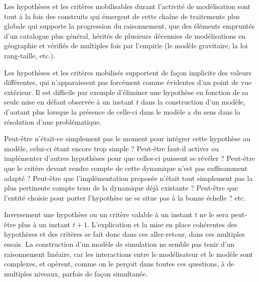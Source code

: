 Les hypothèses et les critères mobilisables durant l'activité de modélisation sont tout à la fois des construits qui émergent de cette chaîne de traitements plus globale qui supporte la progression du raisonnement, que des éléments empruntés d'un catalogue plus général, hérités de plusieurs décennies de modélisations en géographie et vérifiés de multiples fois par l'empirie (le modèle gravitaire, la loi rang-taille, etc.).

Les hypothèses et les critères mobilisés supportent de façon implicite des valeurs différentes, qui n'apparaissent pas forcément comme évidentes d'un point de vue extérieur. Il est difficile par exemple d'éliminer une hypothèse en fonction de sa seule mise en défaut observée à un instant $t$ dans la construction d'un modèle, d'autant plus lorsque la présence de celle-ci dans le modèle a du sens dans la résolution d'une problématique.

Peut-être n'était-ce simplement pas le moment pour intégrer cette hypothèse au modèle, celui-ci étant encore trop simple ? Peut-être faut-il activer ou implémenter d'autres hypothèses pour que celles-ci puissent se révéler ? Peut-être que le critère devant rendre compte de cette dynamique n'est pas suffisamment adapté ? Peut-être que l'implémentation proposée n'était tout simplement pas la plus pertinente compte tenu de la dynamique déjà existante ? Peut-être que l'entité choisie pour porter l'hypothèse ne se situe pas à la bonne échelle ? etc.

Inversement une hypothèse ou un critère valable à un instant $t$ ne le sera peut-être plus à un instant $t + 1$. L'explication et la mise en place cohérentes des hypothèses et des critères se fait donc dans ces aller-retour, dans ces multiples essais. La construction d'un modèle de simulation ne semble pas tenir d'un raisonnement linéaire, car les interactions entre le modélisateur et le modèle sont complexes, et opèrent, comme on le perçoit dans toutes ces questions, à de multiples niveaux, parfois de façon simultanée.

